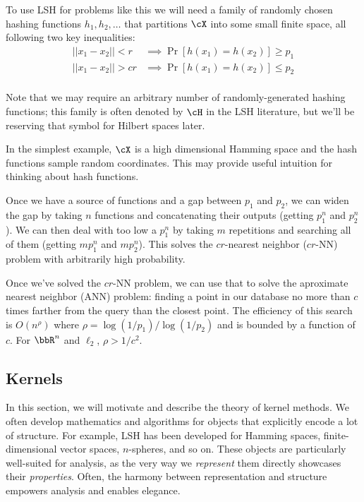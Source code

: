 \documentclass[twoside,11pt]{homework}
\begin{document}
\begin{multicols}{2}
To use LSH for problems like this we will need a family of randomly chosen
hashing functions $h_1,h_2,\dotsc$ that partitions $\cX$ into some small
finite space, all following two key inequalities:
\begin{eqnarray*}
  ||x_1-x_2|| < r &\implies  \Pr[h(x_1)=h(x_2)] \geq p_1 \\
  ||x_1-x_2|| > cr &\implies  \Pr[h(x_1)=h(x_2)] \leq p_2 \\
\end{eqnarray*}

Note that we may require an arbitrary number of randomly-generated
hashing functions; this family is often denoted by $\cH$ in the LSH
literature, but we'll be reserving that symbol for Hilbert spaces later.

In the simplest example, $\cX$ is a high dimensional Hamming space and
the hash functions sample random coordinates.  This may provide useful
intuition for thinking about hash functions.

Once we have a source of functions and a gap between $p_1$ and $p_2$,
we can widen the gap by taking $n$ functions and concatenating their
outputs (getting $p_1^n$ and $p_2^n$).  We can then deal with too low
a $p_1^n$ by taking $m$ repetitions and searching all of them (getting
$mp_1^n$ and $mp_2^n$).  This solves the $cr$-nearest neighbor ($cr$-NN)
problem with arbitrarily high probability.

Once we've solved the $cr$-NN problem, we can use that to solve the
aproximate nearest neighbor (ANN) problem: finding a point in our database
no more than $c$ times farther from the query than the closest point.
The efficiency of this search is $O(n^\rho)$  where
$\rho=\log(1/p_1)/\log(1/p_2)$ and is bounded by a function of $c$.
For $\bbR^n$ and $\ell_2$, $\rho>1/c^2$. \cite{OWZ2009}

\subsection{Kernels} %

In this section, we will motivate and describe the theory of kernel methods.
We often develop mathematics and algorithms for objects that explicitly
encode a lot of structure. For example, LSH has been developed for Hamming
spaces, finite-dimensional vector spaces, $n$-spheres, and so on. These
objects are particularly well-suited for analysis, as the very way we
\emph{represent} them directly showcases their \emph{properties}. Often, the
harmony between representation and structure empowers analysis and enables elegance.


\end{multicols}
\end{document}
